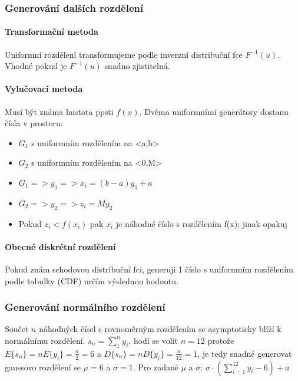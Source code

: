 \documentclass[11pt,a4paper]{scrartcl}
\begin{document}
	\subsubsection{Generování dalších rozdělení}
	
	\paragraph{Transformační metoda}
	Uniformní rozdělení transformujeme podle inverzní distribuční fce $F^{-1}(u)$. Vhodné pokud je $F^{-1}(u)$ snadno zjistitelná.


	\paragraph{Vylučovací metoda}
	Musí být známa hustota ppsti $f(x)$. Dvěma uniformními generátory dostanu čísla v prostoru: 
	
	\begin{itemize}
		\item $G_1$ s uniformním rozdělením na <a,b>
		
		\item $G_2$ s uniformním rozdělením na <0,M>
		
		\item $G_1 => y_1 => x_i = (b-a)y_1 + a$
		
		\item $G_2 => y_2 => z_i = My_2$
		
		\item Pokud $z_i < f(x_i)$ pak $x_i$ je náhodné číslo s rozdělením f(x); jinak opakuj
	\end{itemize}

	\paragraph{Obecné diskrétní rozdělení}
	Pokud znám schodovou distribuční fci, generuji 1 číslo s uniformním rozdělením podle tabulky (CDF) určím výslednou hodnotu.

	\subsubsection{Generování normálního rozdělení}
	Součet $n$ náhodných čísel s rovnoměrným rozdělením se asymptoticky blíží k normálnímu rozdělení. $s_n = \sum_{1}^{n}y_i$, hodí se volit $n = 12$ protože $E\{s_n\} = nE\{y_i\} = \frac{n}{2} = 6$ a $D\{s_n\} = nD\{y_i\} = \frac{n}{12} = 1$, je tedy snadné generovat gaussovo rozdělení se $\mu=6$ a $\sigma=1$. Pro zadané $\mu$ a $\sigma$: $\sigma\cdot(\sum_{i=1}^{12} y_i -6) +a$
	
\end{document}
